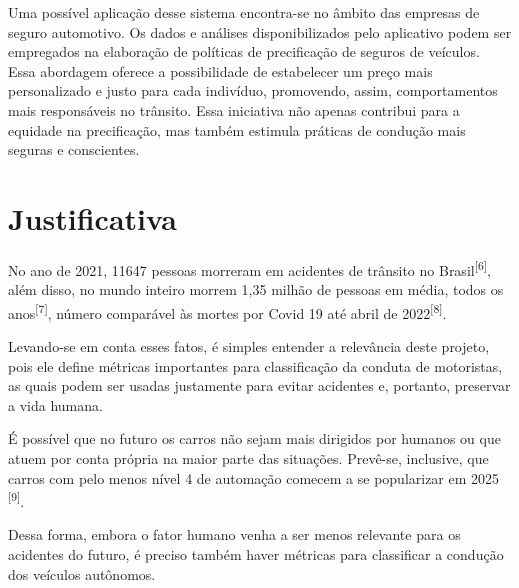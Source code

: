 Uma possível aplicação desse sistema encontra-se no âmbito das empresas de seguro automotivo. Os dados e análises disponibilizados pelo aplicativo podem ser empregados na elaboração de políticas de precificação de seguros de veículos. Essa abordagem oferece a possibilidade de estabelecer um preço mais personalizado e justo para cada indivíduo, promovendo, assim, comportamentos mais responsáveis no trânsito. Essa iniciativa não apenas contribui para a equidade na precificação, mas também estimula práticas de condução mais seguras e conscientes.



 
\section{Justificativa}
No ano de 2021, 11647 pessoas morreram em acidentes de trânsito no Brasil\textsuperscript{[6]}, além disso, no mundo inteiro morrem 1,35 milhão de pessoas em média, todos os anos\textsuperscript{[7]}, número comparável às mortes por Covid 19 até abril de 2022\textsuperscript{[8]}.

Levando-se em conta esses fatos, é simples entender a relevância deste projeto, pois ele define métricas importantes para classificação da conduta de motoristas, as quais podem ser usadas justamente para evitar acidentes e, portanto, preservar a vida humana.

É possível que no futuro os carros não sejam mais dirigidos por humanos ou que atuem por conta própria na maior parte das situações. Prevê-se, inclusive, que carros com pelo menos nível 4 de automação comecem a se popularizar em 2025 \textsuperscript{[9]}.

Dessa forma, embora o fator humano venha a ser menos relevante para os acidentes do futuro, é preciso também haver métricas para classificar a condução dos veículos autônomos.

